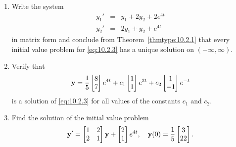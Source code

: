 \documentclass{ximera}
\begin{document}
\begin{example}\label{example:10.2.1}

\begin{enumerate}
\item\label{item:10.2.1a} %
Write the system
\begin{equation} \label{eq:10.2.3}
\begin{array}{rcl}
y_1'&=&y_1+2y_2+2e^{4t} \\
y_2'&=&2y_1+y_2+e^{4t}
\end{array}
\end{equation}
in matrix form and conclude from Theorem~\ref{thmtype:10.2.1} that every
initial value problem for \eqref{eq:10.2.3} has a unique solution on
$(-\infty,\infty)$.
\item\label{item:10.2.1b} %
Verify that
\begin{equation} \label{eq:10.2.4}
{\bf y}=
\frac{1}{5}\begin{bmatrix}8\\7\end{bmatrix}e^{4t}+c_1\begin{bmatrix}1\\1\end{bmatrix}e^{3t}+c_2\begin{bmatrix}1\\-1\end{bmatrix}e^{-t}
\end{equation}
is a solution of \eqref{eq:10.2.3} for all values of the constants $c_1$
and $c_2$.
\item\label{item:10.2.1c} %
Find the  solution of the initial value problem
\begin{equation} \label{eq:10.2.5}
{\bf y}'=\begin{bmatrix}1&2\\2&1\end{bmatrix}{\bf y}+\begin{bmatrix}2\\1\end{bmatrix}e^{4t},\quad  {\bf
y}(0)=\frac{1}{5}\begin{bmatrix}3\\22\end{bmatrix}.
\end{equation}
\end{enumerate}


\end{example}
\end{document}
